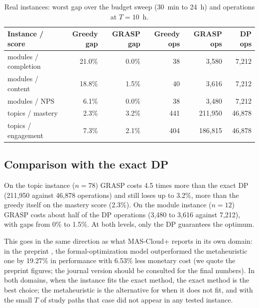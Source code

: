 \begin{table}[h]
\centering
\caption{Real instances: worst gap over the budget sweep (30~min to 24~h) and operations at $T=10$~h.}\label{tab:grasp-real}
\small
\begin{tabular}{@{}l r r r r r@{}}
\toprule
Instance / score & Greedy gap & GRASP gap & Greedy ops & GRASP ops & DP ops\\
\midrule
modules / completion & 21.0\% & 0.0\% & 38 & 3,580 & 7,212\\
modules / content & 18.8\% & 1.5\% & 40 & 3,616 & 7,212\\
modules / NPS & 6.1\% & 0.0\% & 38 & 3,480 & 7,212\\
topics / mastery & 2.3\% & 3.2\% & 441 & 211,950 & 46,878\\
topics / engagement & 7.3\% & 2.1\% & 404 & 186,815 & 46,878\\
\bottomrule
\end{tabular}
\end{table}

\subsection{Comparison with the exact DP}

On the topic instance ($n=78$) GRASP costs 4.5 times more than the exact DP (211,950 against 46,878 operations) and still loses up to 3.2\%, more than the greedy itself on the mastery score (2.3\%). On the module instance ($n=12$) GRASP costs about half of the DP operations (3,480 to 3,616 against 7,212), with gaps from 0\% to 1.5\%. At both levels, only the DP guarantees the optimum.

This goes in the same direction as what MAS-Cloud+ reports in its own domain: in the preprint \cite{mendes2022mascloud}, the formal-optimization model outperformed the metaheuristic one by 19.27\% in performance with 6.53\% less monetary cost (we quote the preprint figures; the journal version \cite{mendes2024mascloud} should be consulted for the final numbers). In both domains, when the instance fits the exact method, the exact method is the best choice; the metaheuristic is the alternative for when it does not fit, and with the small $T$ of study paths that case did not appear in any tested instance.

